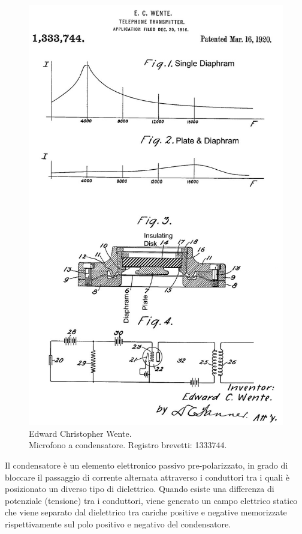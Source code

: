 \begin{refsection}
\begin{figure}[tbhp]
\centering
\includegraphics[width=0.99\columnwidth]{CAPITOLI/0200/img/US1333744-1b.jpg}
\caption[]{Edward Christopher Wente. \\ Microfono a condensatore. Registro brevetti: 1333744.}
\label{mic:condensatore}
\end{figure}

Il condensatore è un elemento elettronico passivo pre-polarizzato, in grado di
bloccare il passaggio di corrente alternata attraverso i conduttori tra i quali
è posizionato un diverso tipo di dielettrico. Quando esiste una differenza di
potenziale (tensione) tra i conduttori, viene generato un campo elettrico
statico che viene separato dal dielettrico tra cariche positive e negative
memorizzate rispettivamente sul polo positivo e negativo del condensatore.


\end{refsection}
